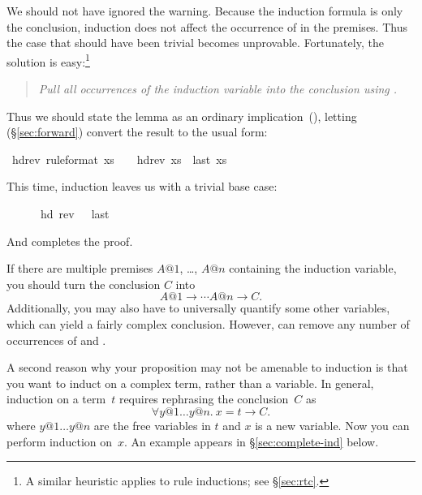 \begin{isabellebody}
\begin{isamarkuptxt}
We should not have ignored the warning. Because the induction
formula is only the conclusion, induction does not affect the occurrence of  in the premises.  
Thus the case that should have been trivial
becomes unprovable. Fortunately, the solution is easy:\footnote{A similar
heuristic applies to rule inductions; see \S\ref{sec:rtc}.}
\begin{quote}
\emph{Pull all occurrences of the induction variable into the conclusion
using \isa{{\isasymlongrightarrow}}.}
\end{quote}
Thus we should state the lemma as an ordinary 
implication~(\isa{{\isasymlongrightarrow}}), letting
 (\S\ref{sec:forward}) convert the
result to the usual \isa{{\isasymLongrightarrow}} form:%
\end{isamarkuptxt}%
\isamarkuptrue%
%
\endisatagproof
{\isafoldproof}%
%
\isadelimproof
%
\endisadelimproof
{}\isamarkupfalse%
\ hd{\isacharunderscore}rev\ {\isacharbrackleft}rule{\isacharunderscore}format{\isacharbrackright}{\isacharcolon}\ {\isachardoublequoteopen}xs\ {\isasymnoteq}\ {\isacharbrackleft}{\isacharbrackright}\ {\isasymlongrightarrow}\ hd{\isacharparenleft}rev\ xs{\isacharparenright}\ {\isacharequal}\ last\ xs{\isachardoublequoteclose}%
\isadelimproof
%
\endisadelimproof
%
\isatagproof
%
\begin{isamarkuptxt}%
\noindent
This time, induction leaves us with a trivial base case:
\begin{isabelle}%
\ {}{\isachardot}\ {\isacharbrackleft}{\isacharbrackright}\ {\isasymnoteq}\ {\isacharbrackleft}{\isacharbrackright}\ {\isasymlongrightarrow}\ hd\ {\isacharparenleft}rev\ {\isacharbrackleft}{\isacharbrackright}{\isacharparenright}\ {\isacharequal}\ last\ {\isacharbrackleft}{\isacharbrackright}%
\end{isabelle}
And  completes the proof.

If there are multiple premises $A@1$, \dots, $A@n$ containing the
induction variable, you should turn the conclusion $C$ into
\[ A@1 \longrightarrow \cdots A@n \longrightarrow C. \]
Additionally, you may also have to universally quantify some other variables,
which can yield a fairly complex conclusion.  However,  
can remove any number of occurrences of \isa{{\isasymforall}} and
\isa{{\isasymlongrightarrow}}.

%
A second reason why your proposition may not be amenable to induction is that
you want to induct on a complex term, rather than a variable. In
general, induction on a term~$t$ requires rephrasing the conclusion~$C$
as
\begin{equation}\label{eqn:ind-over-term}
\forall y@1 \dots y@n.~ x = t \longrightarrow C.
\end{equation}
where $y@1 \dots y@n$ are the free variables in $t$ and $x$ is a new variable.
Now you can perform induction on~$x$. An example appears in
\S\ref{sec:complete-ind} below.


\end{isamarkuptxt}
\end{isabellebody}
